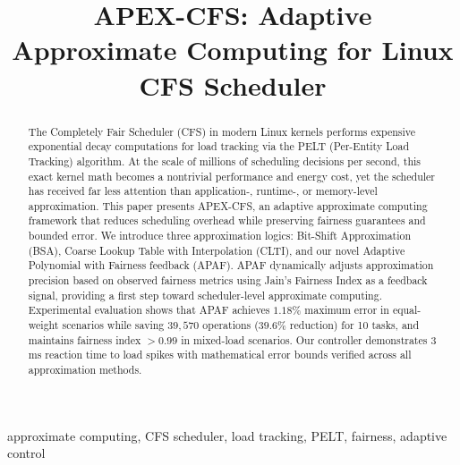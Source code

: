 \documentclass[conference]{IEEEtran}
\begin{document}
\title{APEX-CFS: Adaptive Approximate Computing for Linux CFS Scheduler}

\author{
\and
{}
}

\maketitle

\begin{abstract}
The Completely Fair Scheduler (CFS) in modern Linux kernels performs expensive exponential decay computations for load tracking via the PELT (Per-Entity Load Tracking) algorithm. At the scale of millions of scheduling decisions per second, this exact kernel math becomes a nontrivial performance and energy cost, yet the scheduler has received far less attention than application-, runtime-, or memory-level approximation. This paper presents APEX-CFS, an adaptive approximate computing framework that reduces scheduling overhead while preserving fairness guarantees and bounded error. We introduce three approximation logics: Bit-Shift Approximation (BSA), Coarse Lookup Table with Interpolation (CLTI), and our novel Adaptive Polynomial with Fairness feedback (APAF). APAF dynamically adjusts approximation precision based on observed fairness metrics using Jain's Fairness Index as a feedback signal, providing a first step toward scheduler-level approximate computing. Experimental evaluation shows that APAF achieves $1.18\%$ maximum error in equal-weight scenarios while saving $39{,}570$ operations ($39.6\%$ reduction) for 10 tasks, and maintains fairness index $>0.99$ in mixed-load scenarios. Our controller demonstrates $3$ ms reaction time to load spikes with mathematical error bounds verified across all approximation methods.
\end{abstract}

\begin{IEEEkeywords}
approximate computing, CFS scheduler, load tracking, PELT, fairness, adaptive control
\end{IEEEkeywords}
\end{document}
